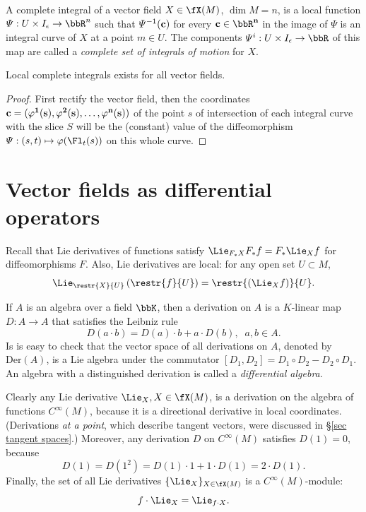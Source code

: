 \begin{defn}\label{def complete integral}
    A complete integral of a vector field $X\in \fX(M)$, $\dim M=n$, is a local function $\varPsi:U\times I_\epsilon\to\bbR^n$ such that $\varPsi^{-1}(\bf{c})$ for every $\bf{c}\in\bbR^n$ in the image of $\varPsi$ is an integral curve of $X$ at a point $m\in U$. The components $\varPsi^i:U\times I_\epsilon\to \bbR$ of this map are called a \emph{complete set of integrals of motion} for $X$.
\end{defn}
\begin{prop}
    Local complete integrals exists for all vector fields.
\end{prop}
\begin{proof}
    First rectify the vector field, then the coordinates $\bf{c}=(\varphi^1(s),\varphi^2(s),\ldots,\varphi^n(s))$ of the point $s$ of intersection of each integral curve with the slice $S$ will be the (constant) value of the diffeomorphism $\varPsi:(s,t)\mapsto \varphi(\Fl_t(s))$ on this whole curve.
\end{proof}




\section{Vector fields as differential operators}

Recall that Lie derivatives of functions satisfy $\Lie_{F_\ast X}F_\ast f=F_\ast\Lie_X f$ for diffeomorphisms $F$. Also, Lie derivatives are local: for any open set $U\subset M$,
\[\Lie_{\restr{X}{U}}\left(\restr{f}{U}\right)=\restr{\left(\Lie_X f\right)}{U}.\]

\begin{defn}[Derivations]
    If $A$ is an algebra over a field $\bbK$, then a derivation on $A$ is a $K$-linear map $D:A\to A$ that satisfies the Leibniz rule
    \[D(a\cdot b)=D(a)\cdot b+a\cdot D(b),\;\; a,b\in A.\]
    Is is easy to check that the vector space of all derivations on $A$, denoted by $\mathrm{Der}(A)$, is a Lie algebra under the commutator $[D_1,D_2]=D_1\circ D_2-D_2\circ D_1$.
    An algebra with a distinguished derivation is called a \emph{differential algebra}.
\end{defn}

Clearly any Lie derivative $\Lie_X, X\in\fX(M)$, is a derivation on the algebra of functions $C^\infty(M)$, because it is a directional derivative in local coordinates. (Derivations \emph{at a point}, which describe tangent vectors, were discussed in \S\ref{sec tangent spaces}.)
Moreover, any derivation $D$ on $C^\infty(M)$ satisfies $D(1)=0$, because
\[D(1)=D(1^2)=D(1)\cdot 1+1\cdot D(1)=2\cdot D(1).\]
Finally, the set of all Lie derivatives $\{\Lie_X\}_{X\in\fX(M)}$ is a $C^\infty(M)$-module:
\[f\cdot\Lie_X=\Lie_{f\cdot X}.\]

